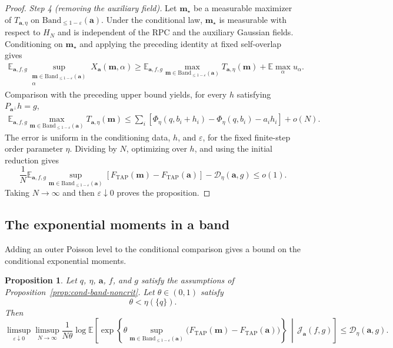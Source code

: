 \documentclass[a4paper,10pt,reqno]{amsart}
\numberwithin{equation}{section}
\newtheorem{proposition}{Proposition}[section]
\newcommand{\ve}{\varepsilon}
\newcommand{\dE}{\mathbb{E}}%
\newcommand{\mc}{\mathcal}
\newcommand{\TAP}{\mathrm{TAP}}
\newcommand{\Band}{\mathrm{Band}}
\newcommand{\bfm}{\mathbf{m}}
\newcommand{\bfa}{\mathbf{a}}
\begin{document}
\begin{proof}
		\medskip\noindent\emph{Step 4 (removing the auxiliary field).}\;
		Let $\bfm_\star$ be a measurable maximizer of $T_{\bfa,\eta}$ on
		$\Band_{\le1-\ve}(\bfa)$. Under the conditional law, $\bfm_\star$
		is measurable with respect to $H_N$ and is independent of the RPC
		and the auxiliary Gaussian fields. Conditioning on $\bfm_\star$ and applying
		the preceding identity at fixed self-overlap gives
		\[
		\begin{aligned}
			\dE_{\bfa,f,g}
			\sup_{\substack{
					\bfm\in\Band_{\le1-\ve}(\bfa)\\
					\alpha
			}}
			X_{\bfa}(\bfm,\alpha)
			\ge
			\dE_{\bfa,f,g}
			\max_{\bfm\in\Band_{\le1-\ve}(\bfa)}
			T_{\bfa,\eta}(\bfm)
			+
			\dE\max_\alpha u_\alpha.
		\end{aligned}
		\]
		Comparison with the preceding upper bound yields, for every
		$h$ satisfying $P_{\bfa^\perp}h=g$,
		\[
		\begin{aligned}
			\dE_{\bfa,f,g}
			\max_{\bfm\in\Band_{\le1-\ve}(\bfa)}
			T_{\bfa,\eta}(\bfm)
			\le
			\sum_i
			\left[
			\Phi_\eta(q,b_i+h_i)
			-\Phi_\eta(q,b_i)-a_i h_i
			\right]
			+o(N).
		\end{aligned}
		\]
		The error is uniform in the conditioning data, $h$, and $\ve$,
		for the fixed finite-step order parameter $\eta$. Dividing by
		$N$, optimizing over $h$, and using the initial reduction gives
		\[
		\frac1N
		\dE_{\bfa,f,g}
		\sup_{\bfm\in\Band_{\le1-\ve}(\bfa)}
		\left[
		F_{\TAP}(\bfm)-F_{\TAP}(\bfa)
		\right]
		-
		\mathscr D_\eta(\bfa,g)
		\le o(1).
		\]
		Taking $N\to\infty$ and then $\ve\downarrow0$ proves the
		proposition.
	\end{proof}
	
	\subsection{The exponential moments in a band}
	
	Adding an outer Poisson level to the conditional comparison gives a
	bound on the conditional exponential moments.
	
	\begin{proposition}
		Let $q$, $\eta$, $\bfa$, $f$, and $g$ satisfy the assumptions of
		Proposition~\ref{prop:cond-band-noncrit}. Let $\theta\in(0,1)$ satisfy
		\[
		\theta<\eta(\{q\}).
		\]
		Then
		\[
		\limsup_{\ve\downarrow0}
		\limsup_{N\to\infty}
		\frac1{N\theta}
		\log
		\dE\left[
		\exp\left\{
		\theta
		\sup_{\bfm\in\Band_{\le1-\ve}(\bfa)}
		\bigl(F_{\TAP}(\bfm)-F_{\TAP}(\bfa)\bigr)
		\right\}
		\,\middle|\,
		\mc J_\bfa(f,g)
		\right]
		\le
		\mathscr D_\eta(\bfa,g).
		\]
	\end{proposition}
	
\end{document}

